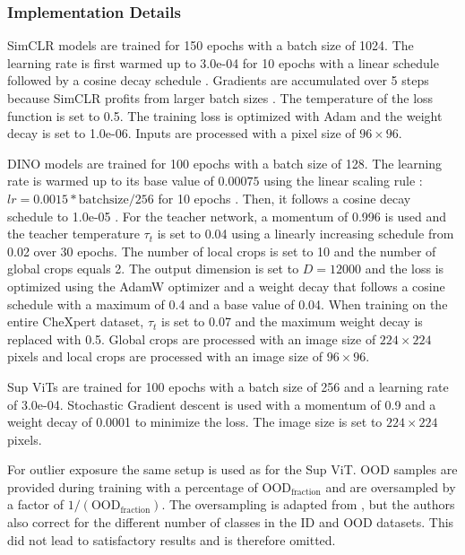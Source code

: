\subsubsection{Implementation Details}
SimCLR models are trained for 150 epochs with a batch size of 1024.
The learning rate is first warmed up to 3.0e-04 for 10 epochs with a linear schedule \citep{Goyal2017} followed by a cosine decay schedule \citep{Chen2020,Loshchilov2016}. 
Gradients are accumulated over 5 steps because SimCLR profits from larger batch sizes \citep{Chen2020}.
The temperature of the loss function is set to 0.5. 
The training loss is optimized with Adam \citep{Kingma2014} and the weight decay is set to 1.0e-06.
Inputs are processed with a pixel size of $96\times96$.
\par
DINO models are trained for 100 epochs with a batch size of 128.
The learning rate is warmed up to its base value of $0.00075$ using the linear scaling rule \citep{Goyal2017}: $lr= 0.0015 * \text{batchsize}/256$ for 10 epochs \citep{Caron2021}.
Then, it follows a cosine decay schedule to 1.0e-05 \citep{Chen2020,Loshchilov2016}.
For the teacher network, a momentum of 0.996 is used and the teacher temperature $\tau_t$ is set to 0.04 using a linearly increasing schedule from 0.02 over 30 epochs.
The number of local crops is set to 10 and the number of global crops equals 2.
The output dimension is set to $D=12000$ and the loss is optimized using the AdamW optimizer \citep{Loshchilov2018} and a weight decay that follows a cosine schedule with a maximum of 0.4 and a base value of 0.04.
When training on the entire CheXpert dataset, $\tau_t$ is set to 0.07 and the maximum weight decay is replaced with 0.5.
Global crops are processed with an image size of $224\times224$ pixels and local crops are processed with an image size of $96\times96$.
\par
Sup ViTs are trained for 100 epochs with a batch size of 256 and a learning rate of 3.0e-04. 
Stochastic Gradient descent is used with a momentum of 0.9 and a weight decay of 0.0001 to minimize the loss.
The image size is set to $224\times224$ pixels.
\par
For outlier exposure the same setup is used as for the Sup ViT.
OOD samples are provided during training with a percentage of $\text{OOD}_\text{fraction}$ and are oversampled by a factor of $1/(\text{OOD}_\text{fraction})$.
The oversampling is adapted from \citep{Fort2021}, but the authors also correct for the different number of classes in the ID and OOD datasets.
This did not lead to satisfactory results and is therefore omitted.
